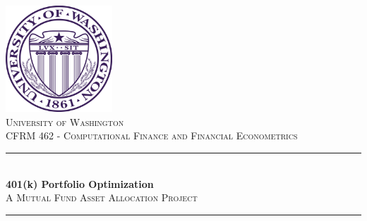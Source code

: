\begin{titlepage}


\newcommand{\HRule}{\rule{\linewidth}{0.5mm}} %

\begin{center}



\includegraphics[height=4cm]{images/uw_seal}\\[1cm] %

\textsc{\LARGE University of Washington}
\\[0.5cm]
\textsc{\large CFRM 462 - Computational Finance and Financial Econometrics}\\[3cm]




\HRule \\[0.9cm]
{\huge \bfseries 401(k) Portfolio Optimization}\\[0.4cm] %
\textsc{\Large A Mutual Fund Asset Allocation Project}\\[0.5cm] %
\HRule \\[1.5cm]



\end{center}
\end{titlepage}
